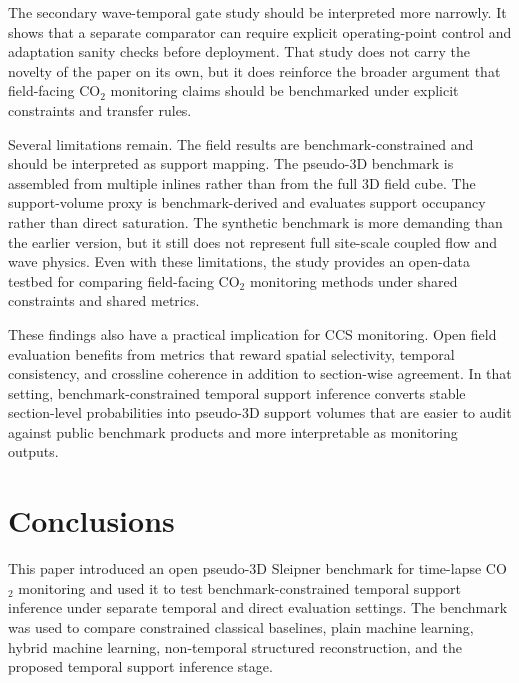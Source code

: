 \documentclass[preprint,12pt]{elsarticle}
\begin{document}
The secondary wave-temporal gate study should be interpreted more narrowly. It shows that a separate comparator can require explicit operating-point control and adaptation sanity checks before deployment. That study does not carry the novelty of the paper on its own, but it does reinforce the broader argument that field-facing CO$_2$ monitoring claims should be benchmarked under explicit constraints and transfer rules.

Several limitations remain. The field results are benchmark-constrained and should be interpreted as support mapping. The pseudo-3D benchmark is assembled from multiple inlines rather than from the full 3D field cube. The support-volume proxy is benchmark-derived and evaluates support occupancy rather than direct saturation. The synthetic benchmark is more demanding than the earlier version, but it still does not represent full site-scale coupled flow and wave physics. Even with these limitations, the study provides an open-data testbed for comparing field-facing CO$_2$ monitoring methods under shared constraints and shared metrics.

These findings also have a practical implication for CCS monitoring. Open field evaluation benefits from metrics that reward spatial selectivity, temporal consistency, and crossline coherence in addition to section-wise agreement. In that setting, benchmark-constrained temporal support inference converts stable section-level probabilities into pseudo-3D support volumes that are easier to audit against public benchmark products and more interpretable as monitoring outputs.

\section{Conclusions}

This paper introduced an open pseudo-3D Sleipner benchmark for time-lapse CO$_2$ monitoring and used it to test benchmark-constrained temporal support inference under separate temporal and direct evaluation settings. The benchmark was used to compare constrained classical baselines, plain machine learning, hybrid machine learning, non-temporal structured reconstruction, and the proposed temporal support inference stage.
\end{document}
